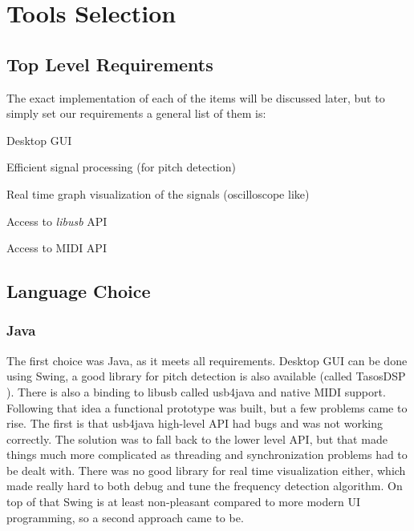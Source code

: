\chapter{Tools Selection}
\label{tools-selection}

\section{Top Level Requirements}
The exact implementation of each of the items will be discussed later, but to
simply set our requirements a general list of them is:

\begin{itemlist}
  \item Desktop GUI
  \item Efficient signal processing (for pitch detection)
  \item Real time graph visualization of the signals (oscilloscope like)
  \item Access to \textit{libusb} \cite{libusb} API
  \item Access to MIDI API
\end{itemlist}

\section{Language Choice}

\subsection{Java}
The first choice was Java, as it meets all requirements. Desktop GUI can be done
using Swing, a good library for pitch detection is also available (called TasosDSP \cite{TarsosDSP}).
There is also a binding to libusb called usb4java and native MIDI support. \\
Following that idea a functional prototype was built, but a few problems came to rise.
The first is that usb4java high-level API had bugs and was not working correctly.
The solution was to fall back to the lower level API, but that made things much
more complicated as threading and synchronization problems had to be dealt with.
There was no good library for
real time visualization either, which made really hard to both debug and tune the
frequency detection algorithm. On top of that Swing is at least non-pleasant
compared to more modern UI programming, so a second approach came to be.

